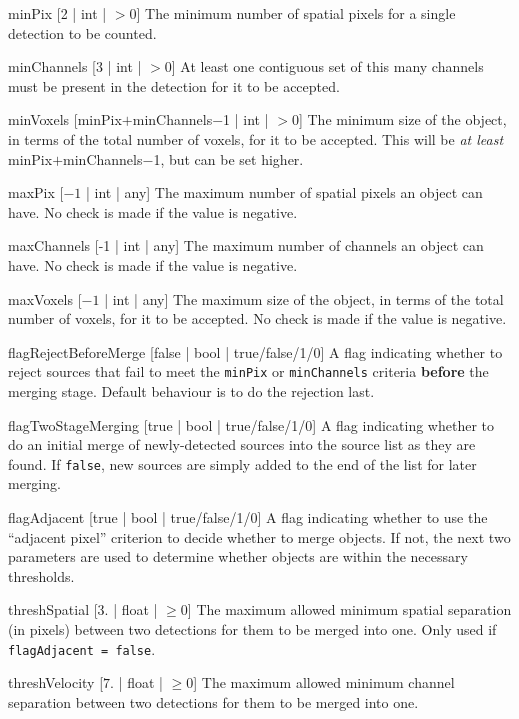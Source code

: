 \begin{Lentry}
\item[{minPix [2 | int | $> 0$]}] The minimum number of spatial pixels for a
  single detection to be counted.
\item[{minChannels [3 | int | $> 0$]}] At least one contiguous set of this many
  channels must be present in the detection for it to be accepted.
\item[{minVoxels [minPix$+$minChannels$-$1 | int | $> 0$]}] The minimum size of
  the object, in terms of the total number of voxels, for it to be
  accepted. This will be \textit{at least} minPix$+$minChannels$-$1,
  but can be set higher.
\item[{maxPix [$-1$ | int | any]}] The maximum number of spatial pixels an object
  can have. No check is made if the value is negative.
\item[{maxChannels [-1 | int | any]}] The maximum number of channels an object can
  have. No check is made if the value is negative.
\item[{maxVoxels [$-1$ | int | any]}] The maximum size of
  the object, in terms of the total number of voxels, for it to be
  accepted. No check is made if the value is negative.
\item[{flagRejectBeforeMerge [false | bool | true/false/1/0]}] A flag
  indicating whether to reject sources that fail to meet the
  \texttt{minPix} or \texttt{minChannels} criteria \textbf{before} the
  merging stage. Default behaviour is to do the rejection last.
\item[{flagTwoStageMerging [true | bool | true/false/1/0]}] A flag
  indicating whether to do an initial merge of newly-detected sources
  into the source list as they are found. If \texttt{false}, new
  sources are simply added to the end of the list for later merging.
\item[{flagAdjacent [true | bool | true/false/1/0]}] A flag indicating
  whether to use the ``adjacent pixel'' criterion to decide whether to
  merge objects. If not, the next two parameters are used to determine
  whether objects are within the necessary thresholds.
\item[{threshSpatial [$3.$ | float | $\ge 0$]}] The maximum allowed
  minimum spatial separation (in pixels) between two detections for
  them to be merged into one. Only used if \texttt{flagAdjacent =
    false}.
\item[{threshVelocity [$7.$ | float | $\ge 0$]}] The maximum allowed
  minimum channel separation between two detections for them to be
  merged into one.
\end{Lentry}


